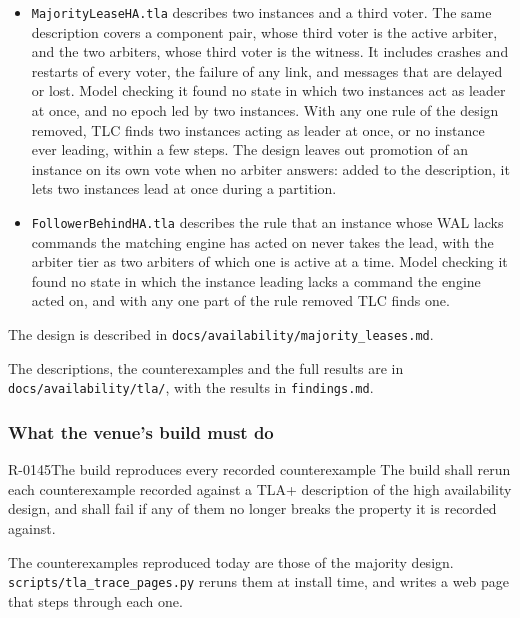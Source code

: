 \begin{itemize}
  \item \texttt{MajorityLeaseHA.tla} describes two instances and a third voter. The
        same description covers a component pair, whose third voter is the active
        arbiter, and the two arbiters, whose third voter is the witness. It includes
        crashes and restarts of every voter, the failure of any link, and messages
        that are delayed or lost. Model checking it found no state in which two
        instances act as leader at once, and no epoch led by two instances. With any
        one rule of the design removed, TLC finds two instances acting as leader at
        once, or no instance ever leading, within a few steps. The design leaves out
        promotion of an instance on its own vote when no arbiter answers: added to
        the description, it lets two instances lead at once during a partition.
  \item \texttt{FollowerBehindHA.tla} describes the rule that an instance whose WAL
        lacks commands the matching engine has acted on never takes the lead, with
        the arbiter tier as two arbiters of which one is active at a time. Model
        checking it found no state in which the instance leading lacks a command the
        engine acted on, and with any one part of the rule removed TLC finds one.
\end{itemize}

The design is described in \texttt{docs/availability/majority\_leases.md}.

The descriptions, the counterexamples and the full results are in
\texttt{docs/availability/tla/}, with the results in \texttt{findings.md}.

\subsubsection{What the venue's build must do}
\label{sec:ha:enabled:model_checking:behaviour}

\begin{requirement}{R-0145}{The build reproduces every recorded counterexample}
  The build shall rerun each counterexample recorded against a TLA+ description of
  the high availability design, and shall fail if any of them no longer breaks the
  property it is recorded against.
\end{requirement}

The counterexamples reproduced today are those of the majority design.
\texttt{scripts/tla\_trace\_pages.py} reruns them at install time, and writes a web
page that steps through each one.
